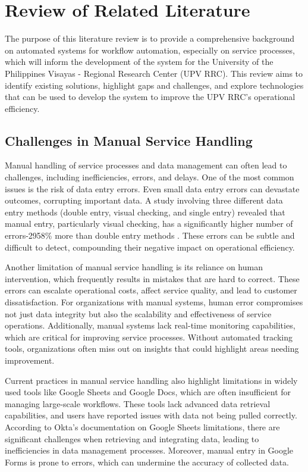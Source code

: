 \chapter{Review of Related Literature}
\label{sec:relatedlit}

The purpose of this literature review is to provide a comprehensive background on automated systems for workflow automation, especially on service processes, which will inform the development of the system for the University of the Philippines Visayas - Regional Research Center (UPV RRC). This review aims to identify existing solutions, highlight gaps and challenges, and explore technologies that can be used to develop the system to improve the UPV RRC’s operational efficiency.

\section{Challenges in Manual Service Handling}

Manual handling of service processes and data management can often lead to challenges, including inefficiencies, errors, and delays. One of the most common issues is the risk of data entry errors. Even small data entry errors can devastate outcomes, corrupting important data. A study involving three different data entry methods (double entry, visual checking, and single entry) revealed that manual entry, particularly visual checking, has a significantly higher number of errors-2958\% more than double entry methods \cite{barchard2011}. These errors can be subtle and difficult to detect, compounding their negative impact on operational efficiency. 

Another limitation of manual service handling is its reliance on human intervention, which frequently results in mistakes that are hard to correct. These errors can escalate operational costs, affect service quality, and lead to customer dissatisfaction. For organizations with manual systems, human error compromises not just data integrity but also the scalability and effectiveness of service operations. Additionally, manual systems lack real-time monitoring capabilities, which are critical for improving service processes. Without automated tracking tools, organizations often miss out on insights that could highlight areas needing improvement.

Current practices in manual service handling also highlight limitations in widely used tools like Google Sheets and Google Docs, which are often insufficient for managing large-scale workflows. These tools lack advanced data retrieval capabilities, and users have reported issues with data not being pulled correctly. According to Okta’s documentation on Google Sheets limitations, there are significant challenges when retrieving and integrating data, leading to inefficiencies in data management processes. Moreover, manual entry in Google Forms is prone to errors, which can undermine the accuracy of collected data.

